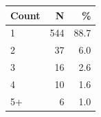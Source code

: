 \centering
\renewcommand{\arraystretch}{1.2}
\setlength{\tabcolsep}{8pt}
\begin{tabular}{lrr}
\toprule
\cellcolor{red!12}\textbf{Count} & \cellcolor{red!12}\textbf{N} & \cellcolor{red!12}\textbf{\%} \\
\midrule
\cellcolor{red!10}1 & \cellcolor{red!10}544 & \cellcolor{red!10}88.7 \\
\cellcolor{red!20}2 & \cellcolor{red!20}37 & \cellcolor{red!20}6.0 \\
\cellcolor{red!30}3 & \cellcolor{red!30}16 & \cellcolor{red!30}2.6 \\
\cellcolor{red!40}4 & \cellcolor{red!40}10 & \cellcolor{red!40}1.6 \\
\cellcolor{red!50}5+ & \cellcolor{red!50}6 & \cellcolor{red!50}1.0 \\
\bottomrule
\end{tabular}
